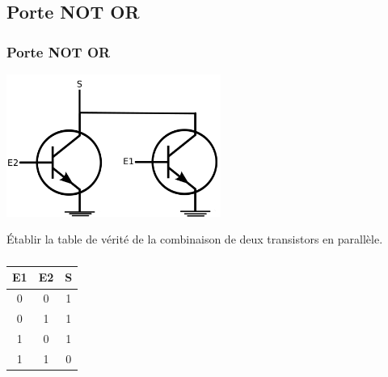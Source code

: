 \documentclass[svgnames,11pt]{beamer}
\begin{document}
\subsection{Porte NOT OR}
\begin{frame}
    \frametitle{Porte NOT OR}
    \begin{center}
        \centering
        \includegraphics[width=7cm]{ressources/schema-nor.png}
        \label{IMG}
    \end{center}

    \begin{activite}
        Établir la table de vérité de la combinaison de deux transistors en parallèle.
    \end{activite}
\end{frame}
\begin{frame}
    \frametitle{}

    \begin{center}
        \begin{tabular}{|c|c|c|}
            \hline
            E1 & E2 & S \\
            \hline
            0  & 0  & 1 \\
            \hline
            0  & 1  & 1 \\
            \hline
            1  & 0  & 1 \\
            \hline
            1  & 1  & 0 \\
            \hline
        \end{tabular}
    \end{center}

\end{frame}
\end{document}

